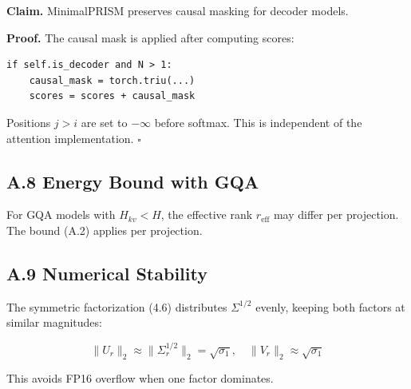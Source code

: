 \textbf{Claim.} MinimalPRISM preserves causal masking for decoder models.

\textbf{Proof.} The causal mask is applied after computing scores:

\begin{lstlisting}
if self.is_decoder and N > 1:
    causal_mask = torch.triu(...)
    scores = scores + causal_mask
\end{lstlisting}

Positions $j > i$ are set to $-\infty$ before softmax. This is independent 
of the attention implementation. $\square$

\subsection{A.8 Energy Bound with GQA}

For GQA models with $H_{kv} < H$, the effective rank $r_\text{eff}$ may 
differ per projection. The bound (A.2) applies per projection.

\subsection{A.9 Numerical Stability}

The symmetric factorization (4.6) distributes $\Sigma^{1/2}$ evenly, keeping 
both factors at similar magnitudes:

\[
\|U_r\|_2 \approx \|\Sigma_r^{1/2}\|_2 = \sqrt{\sigma_1}, \quad
\|V_r\|_2 \approx \sqrt{\sigma_1}
\tag{A.5}
\]

This avoids FP16 overflow when one factor dominates.

